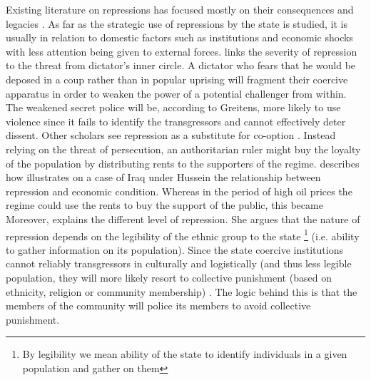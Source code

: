 Existing literature on repressions has focused mostly on their consequences and legacies \citep{rozenas_political_2017, lupu_legacy_2017, zhukov_stalins_2018}. As far as the strategic use of repressions by the state is studied, it is usually in relation to domestic factors such as institutions and economic shocks \citep{davenport_state_2007-1, svolik_politics_2012, greitens_dictators_2016, blaydes_state_2018} with less attention being given to external forces.
\citet{greitens_dictators_2016} links the severity of repression to the threat from dictator's inner circle. A dictator who fears that he would be deposed in a coup rather than in popular uprising will fragment their coercive apparatus in order to weaken the power of a potential challenger from within. The weakened secret police will be, according to Greitens, more likely to use violence since it fails to identify the transgressors and cannot effectively deter dissent. 
Other scholars see repression as a substitute for co-option \citep{wintrobe_political_1998}. Instead relying on the threat of persecution, an authoritarian ruler might buy the loyalty of the population by distributing rents to the supporters of the regime. 
\citet{blaydes_state_2018} describes how 
illustrates on a case of Iraq under Hussein the relationship between repression and economic condition. Whereas in the period of high oil prices the regime could use the rents to buy the support of the public, this became 
Moreover, \citet{blaydes_state_2018} explains the different level of repression. She argues that the nature of repression  depends on the legibility of the ethnic group to the state \footnote{By legibility we mean ability of the state to identify individuals in a given population and gather on them}
(i.e. ability to gather information on its population). Since the state coercive institutions cannot reliably transgressors in  culturally and logistically (and thus less legible population, they will more likely resort to collective punishment (based on ethnicity, religion or community membership) . The logic behind this is that the members of the community will police its members to avoid collective punishment. 


